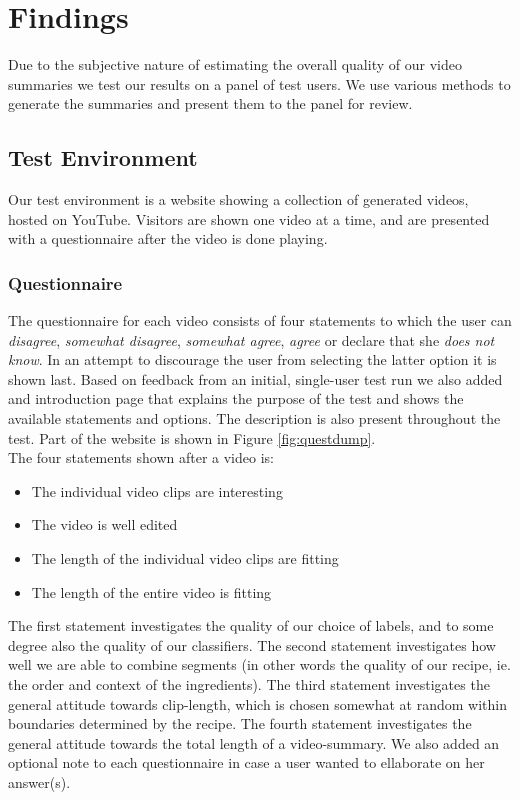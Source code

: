 %
\section{Findings}
%
Due to the subjective nature of estimating the overall quality of our video summaries we test our results on a panel of test users. We use various methods to generate the summaries and present them to the panel for review.
%
\subsection{Test Environment}
%
Our test environment is a website showing a collection of generated videos, hosted on YouTube. Visitors are shown one video at a time, and are presented with a questionnaire after the video is done playing.
%
\subsubsection{Questionnaire}\label{sec:questionnaire}
%
The questionnaire for each video consists of four statements to which the user can \textit{disagree}, \textit{somewhat disagree}, \textit{somewhat agree}, \textit{agree} or declare that she \textit{does not know}. In an attempt to discourage the user from selecting the latter option it is shown last. Based on feedback from an initial, single-user test run we also added and introduction page that explains the purpose of the test and shows the available statements and options. The description is also present throughout the test. Part of the website is shown in Figure \ref{fig:questdump}.\\
%
The four statements shown after a video is:
%
\begin{itemize}
\item The individual video clips are interesting
\item The video is well edited
\item The length of the individual video clips are fitting
\item The length of the entire video is fitting
\end{itemize}
%
The first statement investigates the quality of our choice of labels, and to some degree also the quality of our classifiers. The second statement investigates how well we are able to combine segments (in other words the quality of our recipe, ie. the order and context of the ingredients). The third statement investigates the general attitude towards clip-length, which is chosen somewhat at random within boundaries determined by the recipe. The fourth statement investigates the general attitude towards the total length of a video-summary. We also added an optional note to each questionnaire in case a user wanted to ellaborate on her answer(s).
